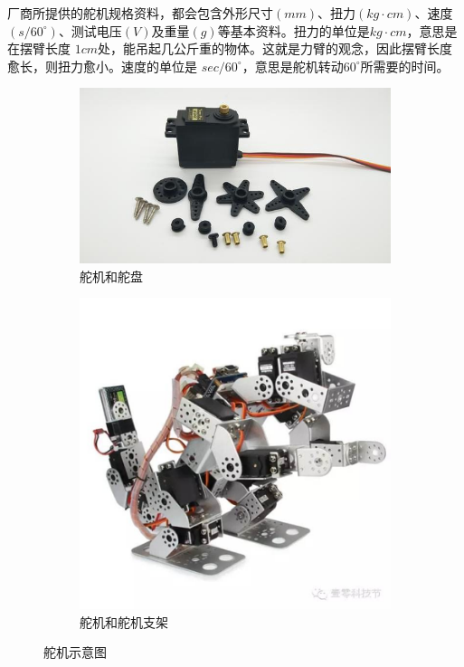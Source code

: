 \documentclass[UTF8]{article} %
\begin{document}
厂商所提供的舵机规格资料，都会包含外形尺寸$(mm)$、扭力$(kg \cdot cm)$、速度$(s/60^{\circ})$、测试电压$(V)$及重量$(g)$等基本资料。扭力的单位是$kg \cdot cm$，意思是在摆臂长度 $1cm$处，能吊起几公斤重的物体。这就是力臂的观念，因此摆臂长度愈长，则扭力愈小。速度的单位是 $sec/60^{\circ}$，意思是舵机转动$60^{\circ}$所需要的时间。

\begin{figure}[H]
  \centering
  \begin{subfigure}[b]{0.4\textwidth}
         \centering
         \includegraphics[width=\textwidth]{duo1.png}
          \caption{舵机和舵盘}
  \end{subfigure}
  \quad
  \begin{subfigure}[b]{0.28\textwidth}
          \centering
          \includegraphics[width=\textwidth]{duo2.png}
          \caption{舵机和舵机支架}
  \end{subfigure}
  \caption{舵机示意图}
\end{figure}
\end{document}
